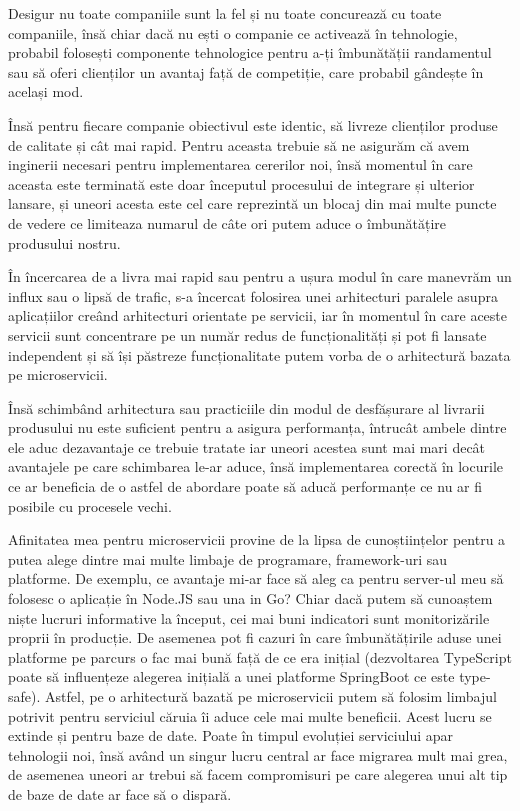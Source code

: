 Desigur nu toate companiile sunt la fel și nu toate concurează cu toate companiile, însă chiar dacă 
nu ești o companie ce activează în tehnologie, probabil folosești componente tehnologice pentru a-ți
îmbunătății randamentul sau să oferi clienților un avantaj față de competiție, care probabil gândește în
același mod.

Însă pentru fiecare companie obiectivul este identic, să livreze clienților produse de calitate și cât mai 
rapid. Pentru aceasta trebuie să ne asigurăm că avem inginerii necesari pentru implementarea cererilor noi,
însă momentul în care aceasta este terminată este doar începutul procesului de integrare și ulterior lansare,
și uneori acesta este cel care reprezintă un blocaj din mai multe puncte de vedere ce limiteaza numarul de câte
ori putem aduce o îmbunătățire produsului nostru.

În încercarea de a livra mai rapid sau pentru a ușura modul în care manevrăm un influx sau o lipsă de trafic,
s-a încercat folosirea unei arhitecturi paralele asupra aplicațiilor creând arhitecturi orientate pe servicii, 
iar în momentul în care aceste servicii sunt concentrare pe un număr redus de funcționalități și pot fi lansate
independent și să își păstreze funcționalitate putem vorba de o arhitectură bazata pe microservicii.

Însă schimbând arhitectura sau practiciile din modul de desfășurare al livrarii produsului nu este suficient
pentru a asigura performanța, întrucât ambele dintre ele aduc dezavantaje ce trebuie tratate iar uneori 
acestea sunt mai mari decât avantajele pe care schimbarea le-ar aduce, însă implementarea corectă în locurile
ce ar beneficia de o astfel de abordare poate să aducă performanțe ce nu ar fi posibile cu procesele vechi.

Afinitatea mea pentru microservicii provine de la lipsa de cunoștiințelor pentru a putea alege dintre mai
multe limbaje de programare, framework-uri sau platforme. De exemplu, ce avantaje mi-ar face să aleg ca 
pentru server-ul meu să folosesc o aplicație în Node.JS sau una in Go? Chiar dacă putem să cunoaștem 
niște lucruri informative la început, cei mai buni indicatori sunt monitorizările proprii în producție. De 
asemenea pot fi cazuri în care îmbunătățirile aduse unei platforme pe parcurs o fac mai bună față de ce era
inițial (dezvoltarea TypeScript poate să influențeze alegerea inițială a unei platforme SpringBoot ce este type-safe).
Astfel, pe o arhitectură bazată pe microservicii putem să folosim limbajul potrivit pentru serviciul căruia
îi aduce cele mai multe beneficii. Acest lucru se extinde și pentru baze de date. Poate în timpul evoluției 
serviciului apar tehnologii noi, însă având un singur lucru central ar face migrarea mult mai grea, de asemenea
uneori ar trebui să facem compromisuri pe care alegerea unui alt tip de baze de date ar face să o dispară.

